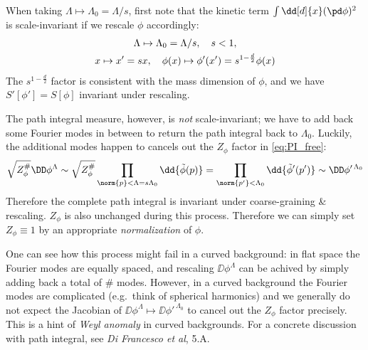 \documentclass[a4paper
	,10pt
]{article}
\begin{document}
	When taking $\Lambda\mapsto \Lambda_0 = \Lambda / s$, first note that the kinetic term $\int \dd[d]{x} (\pd\phi)^2$ is scale-invariant if we rescale $\phi$ accordingly:
	\begin{gather}
		\Lambda\mapsto \Lambda_0 = \Lambda / s,
	\quad
		s < 1,
	\notag\\
		x\mapsto x' = sx,
	\quad
		\phi(x) \mapsto
		\phi'(x') = s^{1 - \frac{d}{2}} \phi(x)
	\end{gather}
	The $s^{1 - \frac{d}{2}}$ factor is consistent with the mass dimension of $\phi$, and we have $S'[\phi'] = S[\phi]$ invariant under rescaling. 
	
\pagebreak[4]
	
	The path integral measure, however, is \textit{not} scale-invariant; we have to add back some Fourier modes in between to return the path integral back to $\Lambda_0$. Luckily, the additional modes happen to cancels out the $Z_\phi$ factor in \eqref{eq:PI_free}:
	\begin{equation}
		\sqrt{Z_\phi^\#} \DD\phi^{\Lambda}
		\sim \sqrt{Z_\phi^\#}
			\prod_{\norm{p} < \Lambda = s\Lambda_0}
			\dd{\tilde{\phi}(p)}
		= \prod_{\norm{p'} < \Lambda_0}
			\dd{\tilde{\phi}'(p')}
		\sim \DD\phi'^{\,\Lambda_0}
	\end{equation}
	Therefore the complete path integral is invariant under coarse-graining \& rescaling. $Z_\phi$ is also unchanged during this process. Therefore we can simply set $Z_\phi \equiv 1$ by an appropriate \textit{normalization} of $\phi$.
	
	One can see how this process might fail in a curved background: in flat space the Fourier modes are equally spaced, and rescaling $\DD\phi^{\Lambda}$ can be achived by simply adding back a total of $\#$ modes. However, in a curved background the Fourier modes are complicated (e.g.\ think of spherical harmonics) and we generally do not expect the Jacobian of $\DD\phi^{\Lambda} \mapsto \DD\phi'^{\,\Lambda_0}$ to cancel out the $Z_\phi$ factor precisely. This is a hint of \textit{Weyl anomaly} in curved backgrounds. For a concrete discussion with path integral, see \textit{Di Francesco et al}, 5.A. 
	
	
\end{document}
